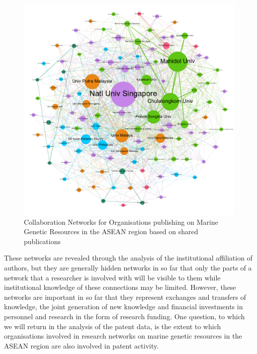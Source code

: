 \documentclass[openany]{book}
\theoremstyle{definition}
\theoremstyle{definition}
\theoremstyle{definition}
\theoremstyle{remark}
\begin{document}
\begin{figure}

{\centering \includegraphics[width=1\linewidth]{images/aseanmarinlit_organisations_gephi} 

}

\caption{Collaboration Networks for Organisations publishing on Marine Genetic Resources in the ASEAN region based on shared publications}\label{fig:organisationnetwork}
\end{figure}

These networks are revealed through the analysis of the institutional
affiliation of authors, but they are generally hidden networks in so far
that only the parts of a network that a researcher is involved with will
be visible to them while institutional knowledge of these connections
may be limited. However, these networks are important in so far that
they represent exchanges and transfers of knowledge, the joint
generation of new knowledge and financial investments in personnel and
research in the form of research funding. One question, to which we will
return in the analysis of the patent data, is the extent to which
organisations involved in research networks on marine genetic resources
in the ASEAN region are also involved in patent activity.
\end{document}

